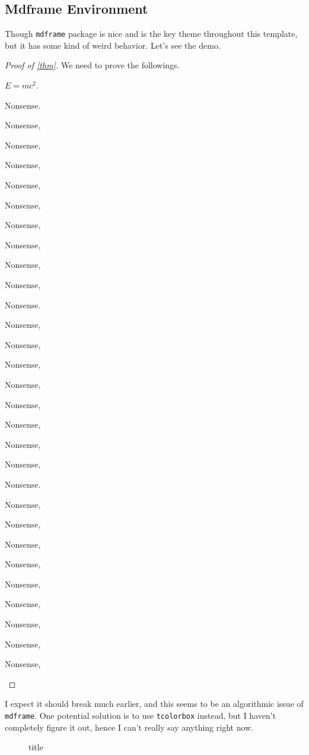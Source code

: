 \subsection{Mdframe Environment}
Though \texttt{mdframe} package is nice and is the key theme throughout this template, but it has some kind of weird behavior. Let's see the demo.
\begin{proof}[Proof of \autoref{thm}]
	We need to prove the followings.
	\begin{claim}
		\(E = mc^{2} \).
	\end{claim}
	\begin{explanation}

		Nonsense.

		Nonsense,

		Nonsense,

		Nonsense,

		Nonsense,

		Nonsense,

		Nonsense,

		Nonsense,

		Nonsense,

		Nonsense,

		Nonsense.

		Nonsense,

		Nonsense,

		Nonsense,

		Nonsense,

		Nonsense,

		Nonsense,

		Nonsense,

		Nonsense,

		Nonsense.

		Nonsense,

		Nonsense,

		Nonsense,

		Nonsense,

		Nonsense,

		Nonsense,

		Nonsense,

		Nonsense,

		Nonsense,
	\end{explanation}

\end{proof}

I expect it should break much earlier, and this seems to be an algorithmic issue of \texttt{mdframe}. One potential solution is to use \texttt{tcolorbox} instead,
but I haven't completely figure it out, hence I can't really say anything right now.
\begin{figure}[H]
	\centering
	\caption{title}
	\label{fig:bas}
\end{figure}